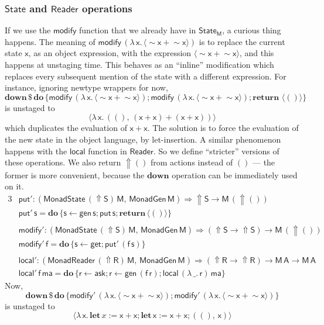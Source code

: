 \documentclass[acmsmall,screen,review,anonymous]{acmart}
\newcommand{\mit}[1]{{\mathsf{#1}}}
\newcommand{\msf}[1]{{\mathsf{#1}}}
\newcommand{\mbf}[1]{{\mathbf{#1}}}
\newcommand{\bs}[1]{\boldsymbol{#1}}
\newcommand{\mdo}{\mbf{do}\,}
\newcommand{\return}{\mbf{return}\,}
\newcommand{\lam}{\lambda\,}
\newcommand{\M}{\msf{M}}
\newcommand{\letdef}{\mbf{let\,}}
\newcommand{\vma}{\mathsf{ma}}
\newcommand{\vA}{\mathsf{A}}
\newcommand{\vS}{\mathsf{S}}
\newcommand{\vR}{\mathsf{R}}
\newcommand{\vM}{\mathsf{M}}
\newcommand{\vx}{\mathsf{x}}
\newcommand{\vf}{\mathsf{f}}
\newcommand{\vs}{\mathsf{s}}
\newcommand{\vr}{\mathsf{r}}
\newcommand{\Reader}{\msf{Reader}}
\newcommand{\fro}{\leftarrow}
\newcommand{\Up}{{\Uparrow}}
\newcommand{\spl}{{\bs{\sim}}}
\newcommand{\ql}{{\bs{\langle}}}
\newcommand{\qr}{{\bs{\rangle}}}
\theoremstyle{remark}
\newcommand{\mdown}{\mbf{down}}
\newcommand{\gen}{\mit{gen}}
\newcommand{\qt}[1]{\ql#1\qr}
\newcommand{\MonadGen}{\msf{MonadGen}}
\newcommand{\MonadState}{\msf{MonadState}}
\newcommand{\MonadReader}{\msf{MonadReader}}
\newcommand{\RA}{\Rightarrow}
\newcommand{\dlr}{\,\$\,}
\newcommand{\State}{\msf{State}}
\newcommand{\modify}{\mit{modify}}
\newcommand{\get}{\mit{get}}
\newcommand{\mput}{\mit{put}}
\begin{document}
\subsubsection{$\State$ and $\Reader$ operations} If we use
the $\modify$ function that we already have in $\State_\M$, a curious thing
happens. The meaning of $\modify\,(\lam \vx.\,\qt{\spl \vx + \spl \vx})$ is to
replace the current state $\vx$, as an object expression, with the expression
$\qt{\spl \vx + \spl \vx}$, and this happens at unstaging time. This behaves as an
``inline'' modification which replaces every subsequent mention of the state
with a different expression. For instance, ignoring newtype wrappers for now,
\[ \mdown \dlr \mdo \{\modify\,(\lam \vx.\,\qt{\spl \vx + \spl \vx}); \modify\,(\lam \vx.\,\qt{\spl \vx + \spl \vx});\return\,\qt{()}\} \]
is unstaged to
\[ \qt{\lam \vx.\,((),\,(\vx + \vx) + (\vx + \vx))} \]
which duplicates the evaluation of $\vx + \vx$. The solution is to force the
evaluation of the new state in the object language, by let-insertion. A similar
phenomenon happens with the $\mit{local}$ function in $\Reader$. So we define
``stricter'' versions of these operations. We also return $\Up ()$ from
actions instead of $()$ --- the former is more convenient, because the $\mdown$
operation can be immediately used on it.
\begingroup
\allowdisplaybreaks
\begin{alignat*}{3}
  & \mput' : (\MonadState\,(\Up \vS)\,\vM,\,\MonadGen\,\vM) \RA \Up \vS \to \vM\,(\Up ()) \\
  & \mput'\,\vs = \mdo \{\vs \fro \gen\,\vs; \mput\,\vs; \return \qt{()}\}\\
  &\\
  & \modify' : (\MonadState\,(\Up \vS)\,\vM,\,\MonadGen\,\vM) \RA (\Up \vS \to \Up \vS) \to \vM\,(\Up ()) \\
  & \modify'\,\vf = \mdo \{\vs \fro \get; \mput'\,(\vf\,\vs)\}\\
  &\\
  & \mit{local'} : (\MonadReader\,(\Up \vR)\,\vM,\,\MonadGen\,\vM) \RA (\Up \vR \to \Up \vR) \to \vM\,\vA \to \vM\,\vA\\
  & \mit{local'}\,\vf\,\vma = \mdo \{\vr \fro \mit{ask}; \vr \fro \gen\,(\vf\,\vr);\mit{local}\,(\lam \_.\,\vr)\,\vma\}
\end{alignat*}
\endgroup
Now,
\[ \mdown \dlr \mdo \{\modify'\,(\lam \vx.\,\qt{\spl \vx + \spl \vx}); \modify'\,(\lam \vx.\,\qt{\spl \vx + \spl \vx})\} \]
is unstaged to
\[ \qt{\lam \vx.\,\letdef x := \vx + \vx; \letdef \vx := \vx + \vx; ((),\,\vx)} \]
\end{document}
